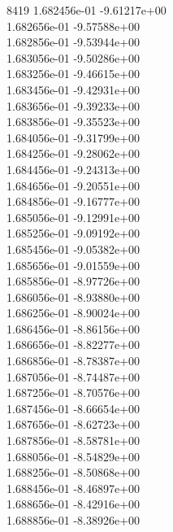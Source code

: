 8419	1.682456e-01	-9.61217e+00	\\ 	1.682656e-01	-9.57588e+00	\\ 	1.682856e-01	-9.53944e+00	\\ 	1.683056e-01	-9.50286e+00	\\ 	1.683256e-01	-9.46615e+00	\\ 	1.683456e-01	-9.42931e+00	\\ 	1.683656e-01	-9.39233e+00	\\ 	1.683856e-01	-9.35523e+00	\\ 	1.684056e-01	-9.31799e+00	\\ 	1.684256e-01	-9.28062e+00	\\ 	1.684456e-01	-9.24313e+00	\\ 	1.684656e-01	-9.20551e+00	\\ 	1.684856e-01	-9.16777e+00	\\ 	1.685056e-01	-9.12991e+00	\\ 	1.685256e-01	-9.09192e+00	\\ 	1.685456e-01	-9.05382e+00	\\ 	1.685656e-01	-9.01559e+00	\\ 	1.685856e-01	-8.97726e+00	\\ 	1.686056e-01	-8.93880e+00	\\ 	1.686256e-01	-8.90024e+00	\\ 	1.686456e-01	-8.86156e+00	\\ 	1.686656e-01	-8.82277e+00	\\ 	1.686856e-01	-8.78387e+00	\\ 	1.687056e-01	-8.74487e+00	\\ 	1.687256e-01	-8.70576e+00	\\ 	1.687456e-01	-8.66654e+00	\\ 	1.687656e-01	-8.62723e+00	\\ 	1.687856e-01	-8.58781e+00	\\ 	1.688056e-01	-8.54829e+00	\\ 	1.688256e-01	-8.50868e+00	\\ 	1.688456e-01	-8.46897e+00	\\ 	1.688656e-01	-8.42916e+00	\\ 	1.688856e-01	-8.38926e+00	\\ \hline
